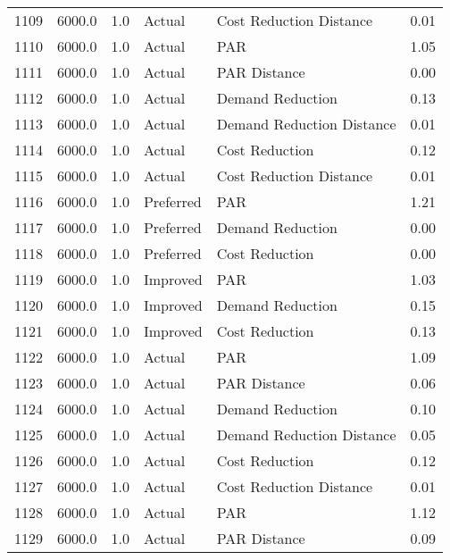 \begin{longtable}{lrrllr}
1109 &       6000.0 &     1.0 &         Actual &    Cost Reduction Distance &   0.01 \\
1110 &       6000.0 &     1.0 &         Actual &                        PAR &   1.05 \\
1111 &       6000.0 &     1.0 &         Actual &               PAR Distance &   0.00 \\
1112 &       6000.0 &     1.0 &         Actual &           Demand Reduction &   0.13 \\
1113 &       6000.0 &     1.0 &         Actual &  Demand Reduction Distance &   0.01 \\
1114 &       6000.0 &     1.0 &         Actual &             Cost Reduction &   0.12 \\
1115 &       6000.0 &     1.0 &         Actual &    Cost Reduction Distance &   0.01 \\
1116 &       6000.0 &     1.0 &      Preferred &                        PAR &   1.21 \\
1117 &       6000.0 &     1.0 &      Preferred &           Demand Reduction &   0.00 \\
1118 &       6000.0 &     1.0 &      Preferred &             Cost Reduction &   0.00 \\
1119 &       6000.0 &     1.0 &       Improved &                        PAR &   1.03 \\
1120 &       6000.0 &     1.0 &       Improved &           Demand Reduction &   0.15 \\
1121 &       6000.0 &     1.0 &       Improved &             Cost Reduction &   0.13 \\
1122 &       6000.0 &     1.0 &         Actual &                        PAR &   1.09 \\
1123 &       6000.0 &     1.0 &         Actual &               PAR Distance &   0.06 \\
1124 &       6000.0 &     1.0 &         Actual &           Demand Reduction &   0.10 \\
1125 &       6000.0 &     1.0 &         Actual &  Demand Reduction Distance &   0.05 \\
1126 &       6000.0 &     1.0 &         Actual &             Cost Reduction &   0.12 \\
1127 &       6000.0 &     1.0 &         Actual &    Cost Reduction Distance &   0.01 \\
1128 &       6000.0 &     1.0 &         Actual &                        PAR &   1.12 \\
1129 &       6000.0 &     1.0 &         Actual &               PAR Distance &   0.09 \\

\end{longtable}
